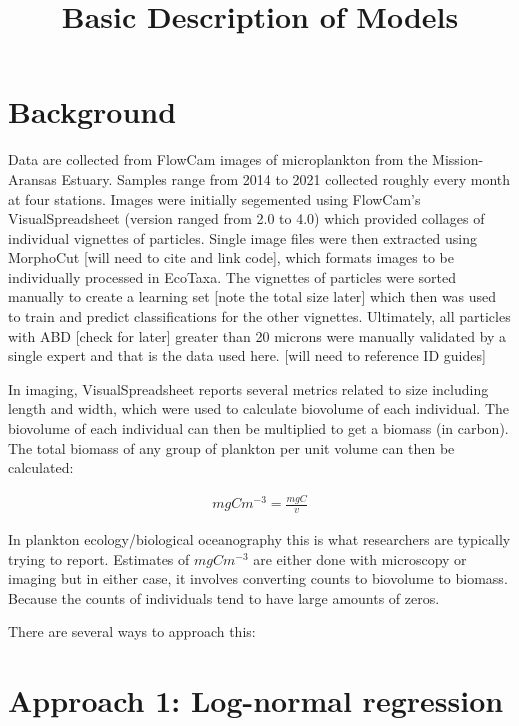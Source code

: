 \documentclass[
  letterpaper,
  DIV=11,
  numbers=noendperiod]{scrartcl}
\title{Basic Description of Models}
\author{}
\date{}
\begin{document}
\maketitle


\section{Background}\label{background}

Data are collected from FlowCam images of microplankton from the
Mission-Aransas Estuary. Samples range from 2014 to 2021 collected
roughly every month at four stations. Images were initially segemented
using FlowCam's VisualSpreadsheet (version ranged from 2.0 to 4.0) which
provided collages of individual vignettes of particles. Single image
files were then extracted using MorphoCut {[}will need to cite and link
code{]}, which formats images to be individually processed in EcoTaxa.
The vignettes of particles were sorted manually to create a learning set
{[}note the total size later{]} which then was used to train and predict
classifications for the other vignettes. Ultimately, all particles with
ABD {[}check for later{]} greater than 20 microns were manually
validated by a single expert and that is the data used here. {[}will
need to reference ID guides{]}

In imaging, VisualSpreadsheet reports several metrics related to size
including length and width, which were used to calculate biovolume of
each individual. The biovolume of each individual can then be multiplied
to get a biomass (in carbon). The total biomass of any group of plankton
per unit volume can then be calculated:

\begin{align}
mgCm^{-3} = \frac{mgC}{v}
\end{align}

In plankton ecology/biological oceanography this is what researchers are
typically trying to report. Estimates of \(mgCm^{-3}\) are either done
with microscopy or imaging but in either case, it involves converting
counts to biovolume to biomass. Because the counts of individuals tend
to have large amounts of zeros.

There are several ways to approach this:

\section{Approach 1: Log-normal
regression}\label{approach-1-log-normal-regression}
\end{document}
